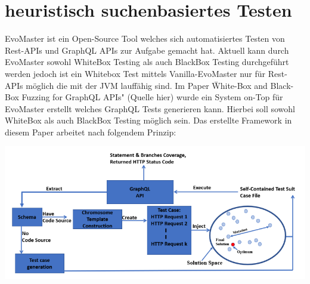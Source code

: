 



\section{heuristisch suchenbasiertes Testen}

EvoMaster ist ein Open-Source Tool welches sich automatisiertes Testen von Rest-APIs und GraphQL APIs zur Aufgabe gemacht hat.
Aktuell kann durch EvoMaster sowohl WhiteBox Testing als auch BlackBox Testing durchgeführt werden jedoch ist ein
Whitebox Test mittels Vanilla-EvoMaster nur für Rest-APIs möglich die mit der JVM lauffähig sind.
Im Paper \"White-Box and Black-Box Fuzzing for GraphQL APIs" (Quelle hier) wurde ein System on-Top für EvoMaster
erstellt welches GraphQL Tests generieren kann. Hierbei soll sowohl WhiteBox als auch BlackBox Testing möglich sein.
Das erstellte Framework in diesem Paper arbeitet nach folgendem Prinzip:

\begin{center}
    \includegraphics[width=\textwidth,height=\textheight,keepaspectratio]{content/hauptteil/related Work/evomaster_framework}
\end{center}

